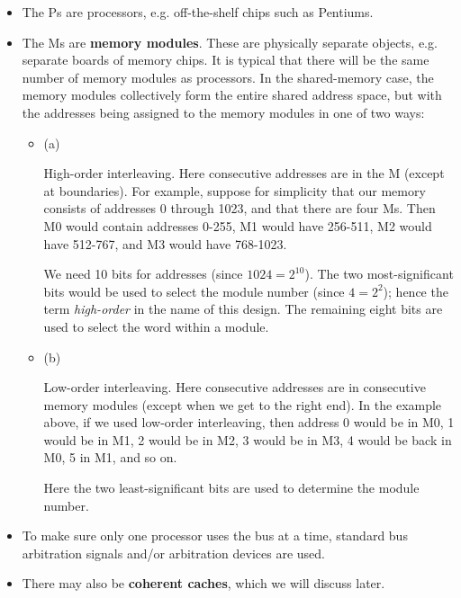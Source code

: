 \begin{itemize}

\item The Ps are processors, e.g. off-the-shelf chips such as Pentiums.

\item The Ms are \textbf{memory modules}. These are physically separate
objects, e.g. separate boards of memory chips.  It is typical that there
will be the same number of memory modules as processors.  In the
shared-memory case, the memory modules collectively form the entire
shared address space, but with the addresses being assigned to the
memory modules in one of two ways:

\begin{itemize}

\item (a)

High-order interleaving. Here consecutive addresses are in the
 M (except at boundaries). For example, suppose for
simplicity that our memory consists of addresses 0 through 1023, and
that there are four Ms.  Then M0 would contain addresses 0-255, M1 would
have 256-511, M2 would have 512-767, and M3 would have
768-1023.

We need 10 bits for addresses (since $1024 = 2^{10}$).  The two
most-significant bits would be used to select the module number (since
$4 = 2^2$); hence the term {\it high-order} in the name of this design.
The remaining eight bits are used to select the word within a module.

\item (b)

Low-order interleaving. Here consecutive addresses are in consecutive
memory modules (except when we get to the right end). In the example
above, if we used low-order interleaving, then address 0 would be in M0,
1 would be in M1, 2 would be in M2, 3 would be in M3, 4 would be back in
M0, 5 in M1, and so on.

Here the two least-significant bits are used to determine the module
number.

\end{itemize}

\item To make sure only one processor uses the bus at a time, standard bus
arbitration signals and/or arbitration devices are used.

\item There may also be \textbf{coherent caches}, which we will discuss later.

\end{itemize}

